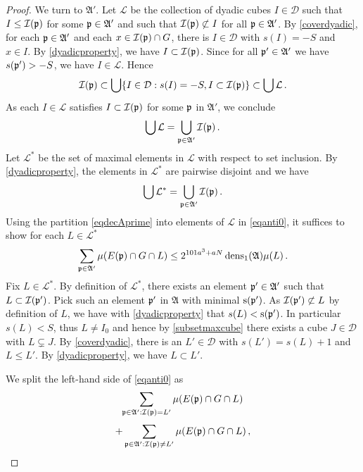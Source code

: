 \begin{proof}
We turn to $\mathfrak{A}'$.
Let $\mathcal{L}$ be the collection of dyadic cubes $I\in\mathcal{D}$ such that $I \le {\mathcal{I}}({\mathfrak p})$
for some ${\mathfrak p}\in\mathfrak{A}'$ and such that ${\mathcal{I}}({\mathfrak p})\not \subset I$ for all ${\mathfrak p}\in\mathfrak{A}'$.
By \eqref{coverdyadic}, for each ${\mathfrak p} \in \mathfrak{A}'$
and each $x\in {\mathcal{I}}({\mathfrak p})\cap G$, there is $I\in \mathcal{D}$ with $s(I)=-S$ and $x\in I$.
By \eqref{dyadicproperty}, we have $I\subset {\mathcal{I}}({\mathfrak p})$. Since for all ${\mathfrak p}' \in \mathfrak{A}'$ we
have $s({\mathfrak p}') > -S$, we have $I \in \mathcal{L}$. Hence
\begin{equation}
    {\mathcal{I}}({\mathfrak p})\subset \bigcup\{I\in \mathcal{D}: s(I)=-S, I\subset {\mathcal{I}}({\mathfrak p})\}\subset \bigcup \mathcal{L}\, .
\end{equation}
As each $I\in \mathcal{L}$ satisfies $I\subset {\mathcal{I}}({\mathfrak p})$ for some ${\mathfrak p}$ in $\mathfrak{A'}$, we conclude
\begin{equation}
    \bigcup\mathcal{L}=\bigcup_{{\mathfrak p} \in \mathfrak{A}'}{\mathcal{I}}({\mathfrak p})\, .
\end{equation}
Let $\mathcal{L}^*$ be the set of maximal elements in $\mathcal{L}$ with respect to set inclusion.
By \eqref{dyadicproperty}, the elements in $\mathcal{L}^*$ are pairwise disjoint and we have
 \begin{equation}\label{eqdecAprime}
\bigcup\mathcal{L}^*=\bigcup_{{\mathfrak p} \in \mathfrak{A}'}{\mathcal{I}}({\mathfrak p})\, .
   \end{equation}
Using the partition \eqref{eqdecAprime} into elements of $\mathcal{L}$ in \eqref{eqanti0}, it suffices to show for each $L\in \mathcal{L}^*$
\begin{equation}\label{eqanti0}
    \sum_{{\mathfrak p}\in\mathfrak{A}'}\mu(E({\mathfrak p})\cap G \cap L)
    \le
    2^{101a^3+aN}
    \operatorname{\operatorname{dens}}_1(\mathfrak{A})\mu(L)\,.
\end{equation}
Fix $L\in \mathcal{L}^*$. By definition of $\mathcal{L}^*$, there exists an element ${\mathfrak p}'\in \mathfrak{A}'$
such that $L\subset {\mathcal{I}}({\mathfrak p}')$. Pick such an element ${\mathfrak p}'$ in $\mathfrak{A}$ with
minimal ${\mathrm{s}}({\mathfrak p}')$. As ${\mathcal{I}}({\mathfrak p}')\not \subset L$ by definition of $L$,
we have with \eqref{dyadicproperty} that $s(L)< {\mathrm{s}}({\mathfrak p}')$.
In particular $s(L)<S$, thus $L \ne I_0$ and hence by \eqref{subsetmaxcube}
there exists a cube $J \in \mathcal{D}$ with $L \subsetneq J$.
By \eqref{coverdyadic}, there is an $L'\in \mathcal{D}$ with $s(L')=s(L)+1$ and $L \le L'$.
By \eqref{dyadicproperty}, we have $L\subset L'$.

We split the left-hand side of \eqref{eqanti0} as
\begin{equation}\label{eqanti1}
    \sum_{{\mathfrak p}\in\mathfrak{A}':{\mathcal{I}}({\mathfrak p})=L'}\mu(E({\mathfrak p})\cap G\cap L)
\end{equation}
\begin{equation}\label{eqanti2}
    +
     \sum_{{\mathfrak p}\in\mathfrak{A}':{\mathcal{I}}({\mathfrak p})\neq L'}\mu(E({\mathfrak p})\cap G\cap L)\, ,
\end{equation}


\end{proof}
